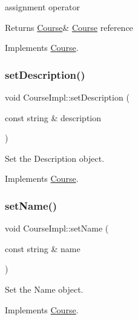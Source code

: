 assignment operator 

\begin{DoxyReturn}{Returns}
\hyperlink{classCourse}{Course}\& \hyperlink{classCourse}{Course} reference 
\end{DoxyReturn}


Implements \hyperlink{classCourse_a460bb6c7b1acb7ecf6a702a3e890e32e}{Course}.

\mbox{\label{classCourseImpl_a38d1a7f80f078828f9f2795aa4219e91}} 
\subsubsection{\texorpdfstring{set\+Description()}{setDescription()}}
{\footnotesize\ttfamily void Course\+Impl\+::set\+Description (\begin{DoxyParamCaption}\item[{const string \&}]{description }\end{DoxyParamCaption})\hspace{0.3cm}{\ttfamily [virtual]}}



Set the Description object. 



Implements \hyperlink{classCourse_a67f5badeddc228e5a4e4dde35f794d97}{Course}.

\mbox{\label{classCourseImpl_af831a30978ba95ab38c90cb82d14ed7b}} 
\subsubsection{\texorpdfstring{set\+Name()}{setName()}}
{\footnotesize\ttfamily void Course\+Impl\+::set\+Name (\begin{DoxyParamCaption}\item[{const string \&}]{name }\end{DoxyParamCaption})\hspace{0.3cm}{\ttfamily [virtual]}}



Set the Name object. 



Implements \hyperlink{classCourse_abf95977e0ba0285c17cac6845f78c4e8}{Course}.

